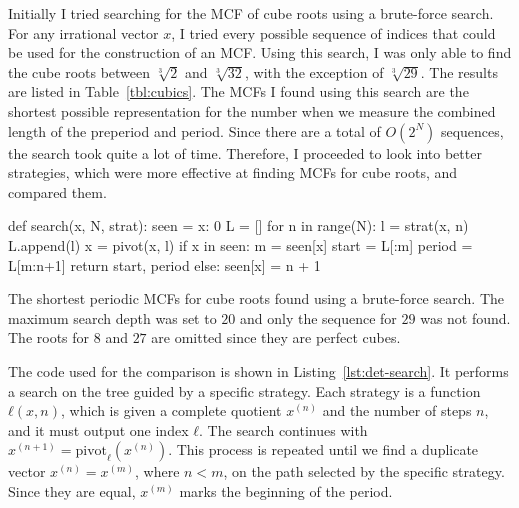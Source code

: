 Initially I tried searching for the MCF of cube roots
using a brute-force search.
For any irrational vector $x$,
I tried every possible sequence of indices
that could be used for the construction of an MCF.
Using this search, I was only able to find the cube roots between $\sqrt[3]{2}$
and $\sqrt[3]{32}$, with the exception of $\sqrt[3]{29}$.
The results are listed in Table~\vref{tbl:cubics}.
The MCFs I found using this search are the shortest possible representation
for the number when we measure the combined length of the preperiod and
period.
Since there are a total of $O(2^N)$ sequences,
the search took quite a lot of time.
Therefore, I proceeded to look into better strategies,
which were more effective at finding MCFs for cube roots,
and compared them.

\begin{Python}[
    float=tbp,
    numbers=left,
    caption={
      The implementation of the search for periodic MCFs.
      The strategy \texttt{strat} outputs the pivot index $ℓ$
      given the current complete quotient and the number of steps.
      The search stops once a duplicate vector $x$ is found,
      at which point the program returns the preperiod and period.
    },
    label={lst:det-search},
  ]
def search(x, N, strat):
  seen = {x: 0}
  L = []
  for n in range(N):
    l = strat(x, n)
    L.append(l)
    x = pivot(x, l)
    if x in seen:
      m = seen[x]
      start = L[:m]
      period = L[m:n+1]
      return start, period
    else:
      seen[x] = n + 1
\end{Python}

\begin{table}[tbp]
  \caption{
    The shortest periodic MCFs for cube roots found using a
    brute-force search. The maximum search depth was set to $20$ and
    only the sequence for $29$ was not found. The roots for $8$ and $27$ are
    omitted since they are perfect cubes.}
  \label{tbl:cubics}
  \centering
  
\end{table}

The code used for the comparison is shown in Listing~\ref{lst:det-search}.
It performs a search on the tree guided by a specific strategy.
Each strategy is a function $ℓ(x, n)$, which is given a complete quotient
$x^{(n)}$ and the number of steps $n$, and it must output one index $ℓ$.
The search continues with $x^{(n+1)} = \mathrm{pivot}_ℓ(x^{(n)})$.
This process is repeated until we find a duplicate vector $x^{(n)} = x^{(m)}$,
where $n < m$, on the path selected by the specific strategy.
Since they are equal, $x^{(m)}$ marks the beginning of the period.

